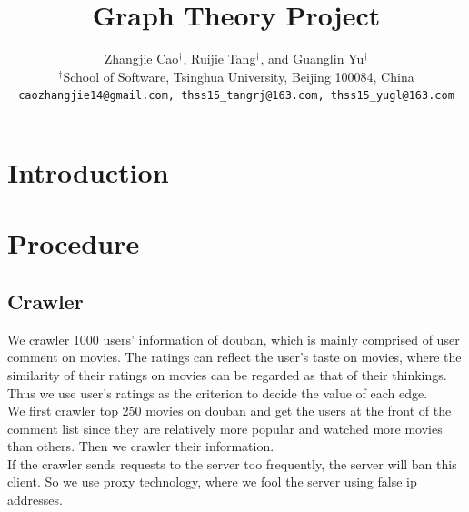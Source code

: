 \documentclass{article}
\title{Graph Theory Project}
\author{
Zhangjie Cao$^\dag$, Ruijie Tang$^\dag$, and Guanglin Yu$^\dag$\\
$^\dag$School of Software, Tsinghua University, Beijing 100084, China\\
\texttt{caozhangjie14@gmail.com, thss15\_tangrj@163.com, thss15\_yugl@163.com}\\
}
\begin{document}
\maketitle

\begin{abstract}

\end{abstract}

\section{Introduction}

\section{Procedure}
\subsection{Crawler}
We crawler 1000 users' information of douban, which is mainly comprised of user comment on movies. The ratings can reflect the user's taste on movies, where the similarity of their ratings on movies can be regarded as that of their thinkings. Thus we use user's ratings as the criterion to decide the value of each edge. \\
We first crawler top 250 movies on douban and get the users at the front of the comment list since they are relatively more popular and watched more movies than others. Then we crawler their information. \\
If the crawler sends requests to the server too frequently, the server will ban this client. So we use proxy technology, where we fool the server using false ip addresses. \\
\end{document}
